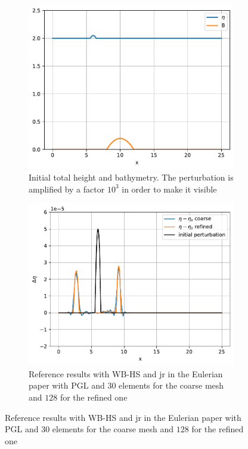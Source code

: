 \documentclass[english]{article}
\theoremstyle{thmstyleone}
\theoremstyle{thmstyletwo}
\theoremstyle{thmstylethree}
\begin{document}
\begin{figure}
	\centering
	\begin{subfigure}{0.40\textwidth}
		\includegraphics[width=\textwidth]{figures/25_LAKEATRESTNONSMOOTH.pdf}\caption{Initial total height and bathymetry. The perturbation is amplified by a factor $10^3$ in order to make it visible}
	\end{subfigure}
	\begin{subfigure}{0.40\textwidth}
		\includegraphics[width=\textwidth]{figures/31_LatRNSWBp3s14jt.pdf}\caption{Reference results with WB-HS and jr in the Eulerian paper with PGL and $30$ elements for the coarse mesh and $128$ for the refined one}

\end{subfigure}
\end{figure}
\end{document}
